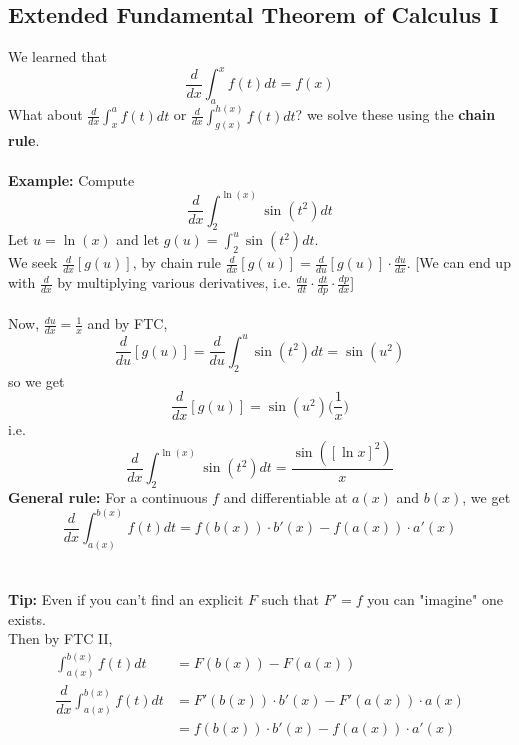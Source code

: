 \documentclass[11pt, a4paper]{memoir}
\theoremstyle{change}
\theoremstyle{plain}
\theoremstyle{nonumberplain}
\numberwithin{equation}{section}
\begin{document}
\subsection{Extended Fundamental Theorem of Calculus I}
We learned that $$\dfrac{d}{dx}\int^x_a f(t) dt = f(x)$$
What about $\frac{d}{dx} \int^a_x f(t) dt$ or $\frac{d}{dx} \int^{h(x)}_{g(x)} f(t) dt$? we solve these using the \textbf{chain rule}. \\ \; \\
\textbf{Example:} Compute $$\dfrac{d}{dx}\int^{\ln(x)}_{2} \sin(t^2) dt$$
Let $u = \ln(x)$ and let $g(u) = \int^u_2 \sin(t^2) dt$. \\
We seek $\frac{d}{dx}[g(u)]$, by chain rule $\frac{d}{dx}[g(u)] = \frac{d}{du}[g(u)] \cdot \frac{du}{dx}$. [We can end up with $\frac{d}{dx}$ by multiplying various derivatives, i.e. $\frac{du}{dt} \cdot \frac{dt}{dp} \cdot \frac{dp}{dx}$]\\ \: \\
Now, $\frac{du}{dx} = \frac{1}{x}$ and by FTC, $$\frac{d}{du}[g(u)] = \frac{d}{du} \int^u_2 \sin(t^2) dt = \sin(u^2)$$
so we get $$\frac{d}{dx}[g(u)] = \sin(u^2)\bigg(\frac{1}{x}\bigg)$$
i.e. $$\frac{d}{dx}\int^{\ln(x)}_{2} \sin(t^2) dt = \dfrac{\sin([\ln x]^2)}{x}$$ 
\textbf{General rule:} For a continuous $f$ and differentiable at $a(x)$ and $b(x)$, we get $$\dfrac{d}{dx} \int^{b(x)}_{a(x)} f(t) dt = f(b(x)) \cdot b'(x) - f(a(x)) \cdot a'(x)$$\\ \: \\
\textbf{Tip:}  Even if you can't find an explicit $F$ such that $F' = f$ you can "imagine" one exists. \\
Then by FTC II,
\begin{align*}
  \int^{b(x)}_{a(x)} f(t) dt &= F(b(x)) - F(a(x)) \\
  \dfrac{d}{dx} \int^{b(x)}_{a(x)} f(t) dt &= F'(b(x)) \cdot b'(x) - F'(a(x)) \cdot a(x)\\
  &= f(b(x)) \cdot b'(x) - f(a(x)) \cdot a'(x)
\end{align*}
\end{document}
